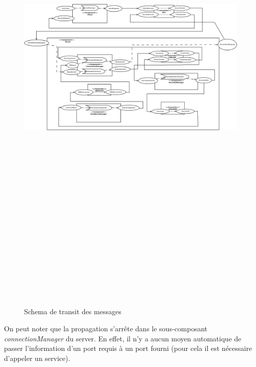         \begin{figure}[h!]
          \centering
          \includegraphics[angle=90,scale=0.5, height=25cm]{Flow.png}
          \caption{Schema de transit des messages}
        \end{figure}
        \FloatBarrier
        
        On peut noter que la propagation s'arrête dans le sous-composant \emph{connectionManager} du server. En effet, il n'y a aucun moyen automatique de passer l'information d'un port requis à un port fourni (pour cela il est nécessaire d'appeler un service).
        

